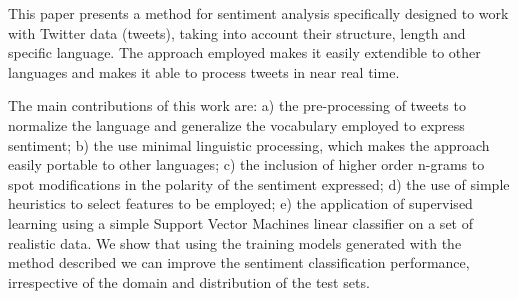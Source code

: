 This paper presents a method for sentiment analysis specifically designed to work with Twitter data (tweets), taking into account 
  their structure, length and specific language. The approach employed makes it
 easily extendible to other languages and makes it able to process tweets in
 near real time. 
 
  The main contributions of this work are: a) the pre-processing of tweets to
 normalize the language and generalize the vocabulary employed to express
 sentiment; b) the use minimal linguistic processing, which makes the approach
 easily portable to other languages; c) the inclusion of higher order n-grams to
 spot modifications in the polarity of the sentiment expressed; d) the use of
 simple heuristics to select features to be employed; e) the application of
 supervised learning using a simple Support Vector Machines linear classifier on
 a set of realistic data. We show that using the training models generated with
 the method described we can improve the sentiment classification performance,
 irrespective of the domain and distribution of the test sets.

